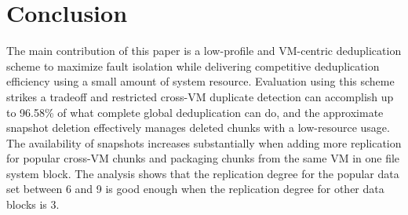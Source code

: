 \section{Conclusion}
\label{sect:conclusion}
The main contribution of this paper is a low-profile and VM-centric deduplication scheme to 
maximize fault isolation while delivering competitive deduplication efficiency using
a small amount of system resource.
Evaluation using  this scheme strikes a tradeoff and restricted cross-VM duplicate detection
can accomplish up to 96.58\% of what complete global
deduplication can do, and the approximate snapshot deletion effectively manages deleted chunks with a 
low-resource usage.  The availability of snapshots increases substantially when
adding more replication for popular cross-VM chunks and packaging chunks from the same 
VM in one file system block. The analysis shows that the replication degree
for the popular data set between 6 and 9 is good enough when the replication degree
for other data blocks is 3.



